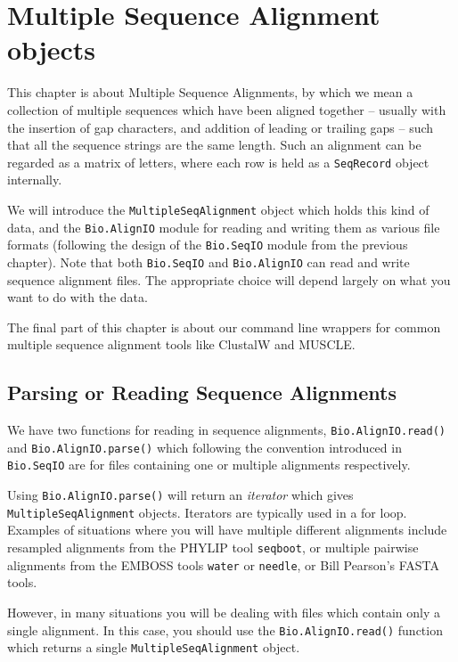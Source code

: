 \documentclass{report}
\begin{document}
\chapter{Multiple Sequence Alignment objects}
\label{chapter:Bio.AlignIO}

This chapter is about Multiple Sequence Alignments, by which we mean a collection of
multiple sequences which have been aligned together -- usually with the insertion of gap
characters, and addition of leading or trailing gaps -- such that all the sequence
strings are the same length. Such an alignment can be regarded as a matrix of letters,
where each row is held as a \verb|SeqRecord| object internally.

We will introduce the \verb|MultipleSeqAlignment| object which holds this kind of data,
and the \verb|Bio.AlignIO| module for reading and writing them as various file formats
(following the design of the \verb|Bio.SeqIO| module from the previous chapter).
Note that both \verb|Bio.SeqIO| and \verb|Bio.AlignIO| can read and write sequence
alignment files.  The appropriate choice will depend largely on what you want to do
with the data.

The final part of this chapter is about our command line wrappers for common multiple
sequence alignment tools like ClustalW and MUSCLE.

\section{Parsing or Reading Sequence Alignments}

We have two functions for reading in sequence alignments, \verb|Bio.AlignIO.read()| and \verb|Bio.AlignIO.parse()| which following the convention introduced in \verb|Bio.SeqIO| are for files containing one or multiple alignments respectively.

Using \verb|Bio.AlignIO.parse()| will return an {\it iterator} which gives \verb|MultipleSeqAlignment| objects.  Iterators are typically used in a for loop.  Examples of situations where you will have multiple different alignments include resampled alignments from the PHYLIP tool \verb|seqboot|, or multiple pairwise alignments from the EMBOSS tools \verb|water| or \verb|needle|, or Bill Pearson's FASTA tools.

However, in many situations you will be dealing with files which contain only a single alignment.  In this case, you should use the \verb|Bio.AlignIO.read()| function which returns a single \verb|MultipleSeqAlignment| object.
\end{document}
